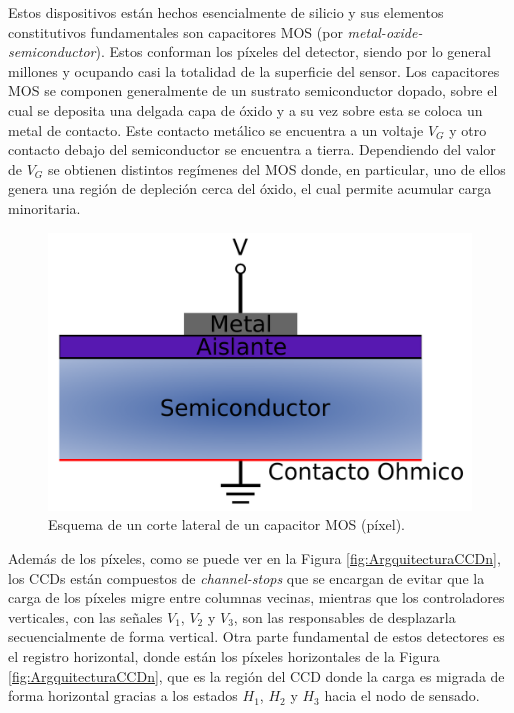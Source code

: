 Estos dispositivos están hechos esencialmente de silicio y sus elementos constitutivos fundamentales son capacitores MOS (por \textit{metal-oxide-semiconductor}). Estos conforman los píxeles del detector, siendo por lo general millones y ocupando casi la totalidad de la superficie del sensor. Los capacitores MOS se componen generalmente de un sustrato semiconductor dopado, sobre el cual se deposita una delgada capa de óxido y a su vez sobre esta se coloca un metal de contacto. Este contacto metálico se encuentra a un voltaje $V_{G}$ y otro contacto debajo del semiconductor se encuentra a tierra. 
Dependiendo del valor de $V_{G}$ se obtienen distintos regímenes del MOS\cite{Chenming} donde, en particular, uno de ellos genera una región de depleción cerca del óxido, el cual permite acumular carga minoritaria.
\begin{figure}[h]
    \centering
        \includegraphics[scale=.35]{Figs/PixelCrossSection.pdf}
    \caption{Esquema de un corte lateral de un capacitor MOS (píxel).}
    \label{fig:PixelCrossSection}
\end{figure}
Además de los píxeles, como se puede ver en la Figura \ref{fig:ArgquitecturaCCDn}, los CCDs están compuestos de \textit{channel-stops} que se encargan de evitar que la carga de los píxeles migre entre columnas vecinas, mientras que los controladores verticales, con las señales $V_{1}$, $V_{2}$ y $V_{3}$, son las responsables de desplazarla secuencialmente de forma vertical. 
Otra parte fundamental de estos detectores es el registro horizontal, donde están los píxeles horizontales de la Figura \ref{fig:ArgquitecturaCCDn}, que es la región del CCD donde la carga es migrada de forma horizontal gracias a los estados $H_{1}$, $H_{2}$ y $H_{3}$ hacia el nodo de sensado.
